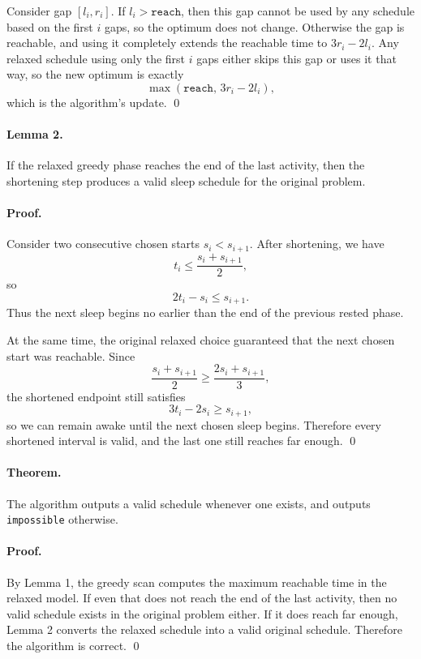 \documentclass[11pt]{article}
\begin{document}
Consider gap $[l_i,r_i]$. If $l_i > \texttt{reach}$, then this gap cannot be used by any schedule based on
the first $i$ gaps, so the optimum does not change. Otherwise the gap is reachable, and using it
completely extends the reachable time to $3r_i-2l_i$. Any relaxed schedule using only the first $i$ gaps
either skips this gap or uses it that way, so the new optimum is exactly
\[
\max(\texttt{reach},\, 3r_i-2l_i),
\]
which is the algorithm's update. \qed

\paragraph{Lemma 2.}
If the relaxed greedy phase reaches the end of the last activity, then the shortening step produces a valid
sleep schedule for the original problem.

\paragraph{Proof.}
Consider two consecutive chosen starts $s_i < s_{i+1}$. After shortening, we have
\[
t_i \le \frac{s_i+s_{i+1}}{2},
\]
so
\[
2t_i-s_i \le s_{i+1}.
\]
Thus the next sleep begins no earlier than the end of the previous rested phase.

At the same time, the original relaxed choice guaranteed that the next chosen start was reachable. Since
\[
\frac{s_i+s_{i+1}}{2} \ge \frac{2s_i+s_{i+1}}{3},
\]
the shortened endpoint still satisfies
\[
3t_i-2s_i \ge s_{i+1},
\]
so we can remain awake until the next chosen sleep begins. Therefore every shortened interval is valid,
and the last one still reaches far enough. \qed

\paragraph{Theorem.}
The algorithm outputs a valid schedule whenever one exists, and outputs \texttt{impossible} otherwise.

\paragraph{Proof.}
By Lemma 1, the greedy scan computes the maximum reachable time in the relaxed model. If even that
does not reach the end of the last activity, then no valid schedule exists in the original problem either.
If it does reach far enough, Lemma 2 converts the relaxed schedule into a valid original schedule.
Therefore the algorithm is correct. \qed
\end{document}
